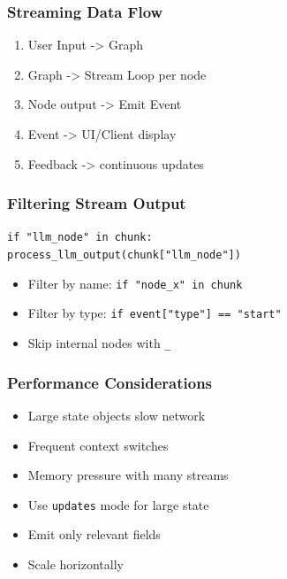 \documentclass[aspectratio=169,11pt]{beamer}
\begin{document}
\begin{frame}
\frametitle{Streaming Data Flow}
\begin{tipbox}
\setlength{\itemsep}{1pt}
\begin{enumerate}
\item User Input -> Graph
\item Graph -> Stream Loop per node
\item Node output -> Emit Event
\item Event -> UI/Client display
\item Feedback -> continuous updates
\end{enumerate}
\end{tipbox}
\end{frame}

\begin{frame}
\frametitle{Filtering Stream Output}
\begin{tipbox}
\texttt{if "llm\_node" in chunk:}\\
\quad\texttt{process\_llm\_output(chunk["llm\_node"])}
\end{tipbox}
\vspace{0.1cm}
\begin{tipbox}
\setlength{\itemsep}{1pt}
\begin{itemize}
\item Filter by name: \texttt{if "node\_x" in chunk}
\item Filter by type: \texttt{if event["type"] == "start"}
\item Skip internal nodes with \texttt{\_}
\end{itemize}
\end{tipbox}
\end{frame}

\begin{frame}
\frametitle{Performance Considerations}
\begin{warningbox}
\setlength{\itemsep}{1pt}
\begin{itemize}
\item Large state objects slow network
\item Frequent context switches
\item Memory pressure with many streams
\end{itemize}
\end{warningbox}
\vspace{0.1cm}
\begin{tipbox}
\setlength{\itemsep}{1pt}
\begin{itemize}
\item Use \texttt{updates} mode for large state
\item Emit only relevant fields
\item Scale horizontally
\end{itemize}
\end{tipbox}
\end{frame}
\end{document}
